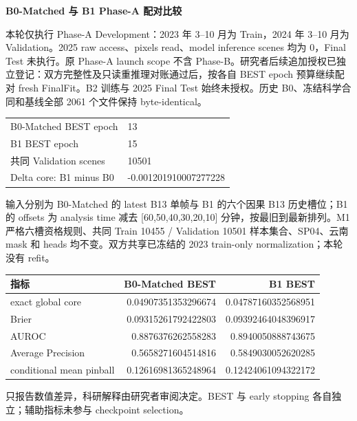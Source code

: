 \documentclass[UTF8,11pt,fontset=windows]{ctexart}
\begin{document}
\begin{center}{\Large\bfseries B0-Matched 与 B1 Phase-A 配对比较}\end{center}
本轮仅执行 Phase-A Development：2023 年 3--10 月为 Train，2024 年 3--10 月为 Validation。2025 raw access、pixels read、model inference scenes 均为 0，Final Test 未执行。原 Phase-A launch scope 不含 Phase-B。研究者后续追加授权已独立登记：双方完整性及只读重推理对账通过后，按各自 BEST epoch 预算继续配对 fresh FinalFit。B2 训练与 2025 Final Test 始终未授权。历史 B0、冻结科学合同和基线全部 2061 个文件保持 byte-identical。

\begin{tabularx}{\textwidth}{@{}p{41mm}Y@{}}\toprule
B0-Matched BEST epoch & 13 \\
B1 BEST epoch & 15 \\
共同 Validation scenes & 10501 \\
Delta core: B1 minus B0 & -0.001201910007277228 \\
\bottomrule\end{tabularx}

输入分别为 B0-Matched 的 latest B13 单帧与 B1 的六个因果 B13 历史槽位；B1 的 offsets 为 analysis time 减去 [60,50,40,30,20,10] 分钟，按最旧到最新排列。M1 严格六槽资格规则、共同 Train 10455 / Validation 10501 样本集合、SP04、云南 mask 和 heads 均不变。双方共享已冻结的 2023 train-only normalization；本轮没有 refit。

\begin{tabularx}{\textwidth}{@{}Yrr@{}}\toprule 指标 & B0-Matched BEST & B1 BEST \\ \midrule
exact global core & 0.04907351353296674 & 0.04787160352568951 \\
Brier & 0.09315261792422803 & 0.09392464048396917 \\
AUROC & 0.8876376262558283 & 0.8940050888743675 \\
Average Precision & 0.5658271604514816 & 0.5849030052620285 \\
conditional mean pinball & 0.12616981365248964 & 0.12424061094322172 \\
\bottomrule\end{tabularx}

只报告数值差异，科研解释由研究者审阅决定。BEST 与 early stopping 各自独立；辅助指标未参与 checkpoint selection。
\end{document}
